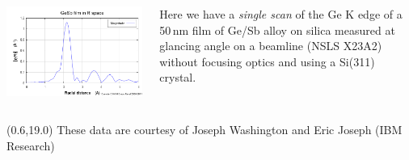 \documentclass[10pt, xcolor=x11names, compress]{beamer}
\begin{document}
\begin{frame}
\begin{columns}
\begin{column}{0.36\linewidth}
      \includegraphics[width=\linewidth]{images/gesb_chir.png}
    \end{column}
    \begin{column}{0.60\linewidth}
      Here we have a \textit{single scan} of the Ge K edge of a 50\,nm
      film of Ge/Sb alloy on silica measured at glancing angle on a
      beamline (NSLS X23A2) without focusing optics and using a
      Si(311) crystal.
    \end{column}
  \end{columns}
  \begin{textblock*}{0.4\linewidth}(0.6\linewidth,19.0\TPVertModule)%
    \tiny%
    These data are courtesy of Joseph Washington and Eric
    Joseph (IBM Research)
  \end{textblock*}
\end{frame}
\end{document}
